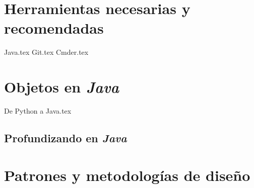 \documentclass[12pt]{book}
\begin{document}
  \frontmatter
  \maketitle
  \tableofcontents
  

  \mainmatter
  \part{Herramientas necesarias y recomendadas}
    {Java.tex}
    {Git.tex}
    {Cmder.tex}
  \part{Objetos en \textit{Java}}
    
    {De Python a Java.tex}
    \chapter{Profundizando en \textit{Java}}
      \label{ch:java}
  \part{Patrones y metodologías de diseño}
  \nocite{*}
  \printbibliography
\end{document}
